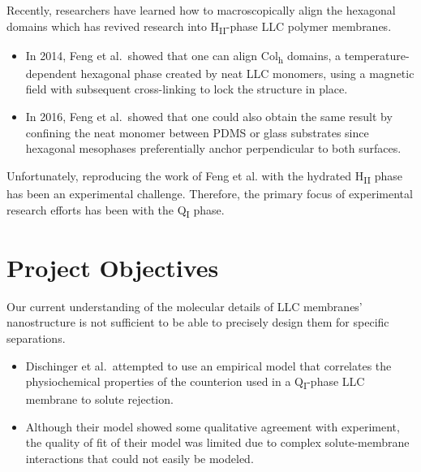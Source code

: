 \documentclass{article}
\begin{document}
  Recently, researchers have learned how to macroscopically align the
  hexagonal domains which has revived research into H\textsubscript{II}-phase LLC
  polymer membranes. 
  \begin{itemize}
    \item In 2014, Feng et al.~showed that one can align Col\textsubscript{h}
    domains, a temperature-dependent hexagonal phase created by neat LLC monomers,
    using a magnetic field with subsequent cross-linking to lock the structure 
    in place\cite{feng_scalable_2014}.
	\item In 2016, Feng et al.~showed that one could also obtain the same result
	by confining the neat monomer between PDMS or glass substrates since hexagonal
	mesophases preferentially anchor perpendicular to both surfaces\cite{feng_thin_2016}.
  \end{itemize}
  
  Unfortunately, reproducing the work of Feng et al. with the hydrated 
  H\textsubscript{II} phase has been an experimental challenge. Therefore, the
  primary focus of experimental research efforts has been with the Q\textsubscript{I} phase.

  \section{Project Objectives}\label{section:objectives}  
  
  Our current understanding of the molecular details of LLC membranes'
  nanostructure is not sufficient to be able to precisely design them for
  specific separations. 
  \begin{itemize} 
    \item Dischinger et al.~attempted to use an empirical model
    that correlates the physiochemical properties of the counterion used in
    a Q\textsubscript{I}-phase LLC membrane to solute rejection.\cite{dischinger_effect_2017}
    \item Although their model showed some qualitative agreement with experiment, the
    quality of fit of their model was limited due to complex solute-membrane
    interactions that could not easily be modeled. 
  \end{itemize}
\end{document}
